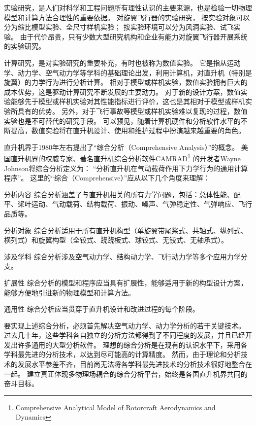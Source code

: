 \documentclass[doctor,openright,twoside,color]{buaathesis}
\begin{document}
实验研究，是人们对科学和工程问题所有理性认识的主要来源，也是检验一切物理模型和计算方法合理性的重要依据。
对旋翼飞行器的实验研究，
按实验对象可以分为缩比模型实验、全尺寸样机实验；
按实验环境可以分为风洞实验、试飞实验。
由于代价昂贵，只有少数大型研究机构和企业有能力对旋翼飞行器开展系统的实验研究。

计算研究，是对实验研究的重要补充，有时也被称为数值实验。
它是指从运动学、动力学、空气动力学等学科的基础理论出发，利用计算机，对直升机（特别是旋翼）的力学行为进行分析计算。
相对于模型或样机实验，数值实验拥有巨大的成本优势，这是驱动计算研究不断发展的主要动力。
对于新的设计方案，数值实验能够先于模型或样机实验对其性能指标进行评价，这也是其相对于模型或样机实验所具有的优势。
另外，对于飞行事故等模型或样机实验难以复现的过程，数值实验也是不可替代的研究手段。
可以预见，随着计算机硬件和分析软件水平的不断提高，数值实验将在直升机设计、使用和维护过程中扮演越来越重要的角色。

直升机界于1980年左右提出了“综合分析（Comprehensive Analysis）”的概念。
美国直升机界的权威专家、著名直升机综合分析软件CAMRAD\footnote{Comprehensive Analytical Model of Rotorcraft Aerodynamics and Dynamics}
的开发者Wayne Johnson将综合分析定义为：
“分析直升机在气动载荷作用下力学行为的通用计算程序”。
这里的“综合（Comprehensive）”应从以下几个角度来理解：
\begin{compactdesc}
  \item[分析内容]
  综合分析涵盖了与直升机相关的所有力学问题，包括：总体性能、配平、桨叶运动、气动载荷、结构载荷、振动、噪声、气弹稳定性、气弹响应、飞行品质等。
  \item[分析对象]
  综合分析适用于所有直升机构型（单旋翼带尾桨式、共轴式、纵列式、横列式）和旋翼构型（全铰式、跷跷板式、球铰式、无铰式、无轴承式）。
  \item[涉及学科]
  综合分析涉及空气动力学、结构动力学、飞行动力学等多个应用力学分支。
  \item[扩展性]
  综合分析的模型和程序应当具有扩展性，能够适用于新的构型设计方案，能够方便地引进新的物理模型和计算方法。
  \item[通用性]
  综合分析应当贯穿于直升机设计和改进过程的每个阶段。
\end{compactdesc}

要实现上述综合分析，必须首先解决空气动力学、动力学分析的若干关键技术。
过去几十年，这些学科各自独立的分析方法都得到了不同程度的发展，并且已经开发出许多通用的大型分析软件。
理想的综合分析是在现有的认识水平下，采用各学科最先进的分析技术，以达到尽可能高的计算精度。
然而，由于理论和分析技术的发展水平参差不齐，目前尚无法将各学科最先进技术的分析技术很好地整合在一起。
建立真正体现多物理场耦合的综合分析平台，始终是各国直升机界共同的奋斗目标。
\end{document}
